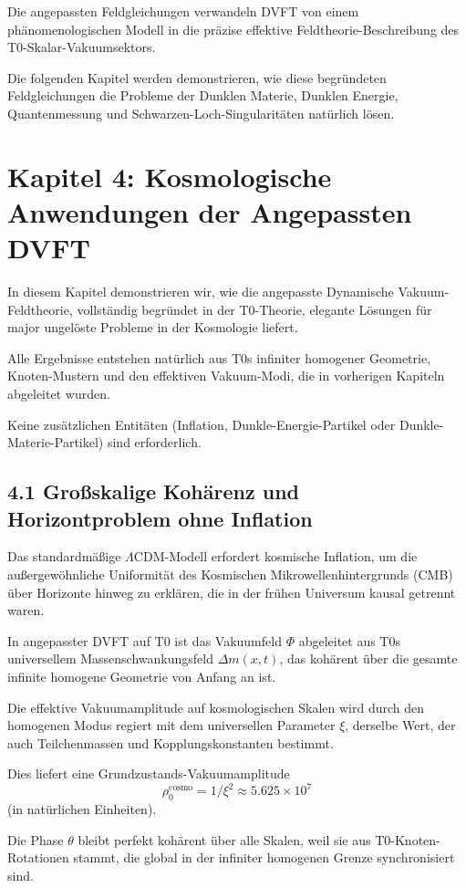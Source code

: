 	Die angepassten Feldgleichungen verwandeln DVFT von einem phänomenologischen Modell in die präzise effektive Feldtheorie-Beschreibung des T0-Skalar-Vakuumsektors.
	
	Die folgenden Kapitel werden demonstrieren, wie diese begründeten Feldgleichungen die Probleme der Dunklen Materie, Dunklen Energie, Quantenmessung und Schwarzen-Loch-Singularitäten natürlich lösen.
	
	\section{Kapitel 4: Kosmologische Anwendungen der Angepassten DVFT}
	
	In diesem Kapitel demonstrieren wir, wie die angepasste Dynamische Vakuum-Feldtheorie, vollständig begründet in der T0-Theorie, elegante Lösungen für major ungelöste Probleme in der Kosmologie liefert.
	
	Alle Ergebnisse entstehen natürlich aus T0s infiniter homogener Geometrie, Knoten-Mustern und den effektiven Vakuum-Modi, die in vorherigen Kapiteln abgeleitet wurden.
	
	Keine zusätzlichen Entitäten (Inflation, Dunkle-Energie-Partikel oder Dunkle-Materie-Partikel) sind erforderlich.
	
	\subsection{4.1 Großskalige Kohärenz und Horizontproblem ohne Inflation}
	
	Das standardmäßige $\Lambda$CDM-Modell erfordert kosmische Inflation, um die außergewöhnliche Uniformität des Kosmischen Mikrowellenhintergrunds (CMB) über Horizonte hinweg zu erklären, die in der frühen Universum kausal getrennt waren.
	
	In angepasster DVFT auf T0 ist das Vakuumfeld $\Phi$ abgeleitet aus T0s universellem Massenschwankungsfeld $\Delta m(x,t)$, das kohärent über die gesamte infinite homogene Geometrie von Anfang an ist.
	
	Die effektive Vakuumamplitude auf kosmologischen Skalen wird durch den homogenen Modus regiert mit dem universellen Parameter $\xi$, derselbe Wert, der auch Teilchenmassen und Kopplungskonstanten bestimmt.
	
	Dies liefert eine Grundzustands-Vakuumamplitude
	\[
	\rho_0^{\text{cosmo}} = 1 / \xi^2 \approx 5.625 \times 10^7
	\]
	(in natürlichen Einheiten).
	
	Die Phase $\theta$ bleibt perfekt kohärent über alle Skalen, weil sie aus T0-Knoten-Rotationen stammt, die global in der infiniter homogenen Grenze synchronisiert sind.
	
